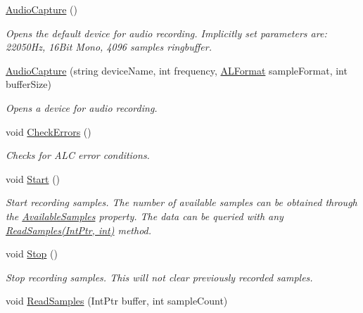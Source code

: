 \begin{DoxyCompactItemize}
\item 
\hyperlink{class_open_t_k_1_1_audio_1_1_audio_capture_a719993b2da0506a1f977847865751023}{Audio\-Capture} ()
\begin{DoxyCompactList}\small\item\em Opens the default device for audio recording. Implicitly set parameters are\-: 22050\-Hz, 16\-Bit Mono, 4096 samples ringbuffer. \end{DoxyCompactList}\item 
\hyperlink{class_open_t_k_1_1_audio_1_1_audio_capture_a042d3f5c08d029221bdf8da8a77a04e8}{Audio\-Capture} (string device\-Name, int frequency, \hyperlink{namespace_open_t_k_1_1_audio_1_1_open_a_l_a4223e02452abfb5070f9b9bf1d426ffc}{A\-L\-Format} sample\-Format, int buffer\-Size)
\begin{DoxyCompactList}\small\item\em Opens a device for audio recording.\end{DoxyCompactList}\item 
void \hyperlink{class_open_t_k_1_1_audio_1_1_audio_capture_a5e6e107b6cb6db8b984659ca02cc23f9}{Check\-Errors} ()
\begin{DoxyCompactList}\small\item\em Checks for A\-L\-C error conditions. \end{DoxyCompactList}\item 
void \hyperlink{class_open_t_k_1_1_audio_1_1_audio_capture_a8865bdca65eaaae4a362ae1bceea5d96}{Start} ()
\begin{DoxyCompactList}\small\item\em Start recording samples. The number of available samples can be obtained through the \hyperlink{class_open_t_k_1_1_audio_1_1_audio_capture_a762b64b2992d6d3f4ba2273bf66fbe41}{Available\-Samples} property. The data can be queried with any \hyperlink{class_open_t_k_1_1_audio_1_1_audio_capture_ab883e5df4b82fce382af12713a59b5ec}{Read\-Samples(\-Int\-Ptr, int)} method. \end{DoxyCompactList}\item 
void \hyperlink{class_open_t_k_1_1_audio_1_1_audio_capture_a231cbcf12c758e7e08988c578f62b44c}{Stop} ()
\begin{DoxyCompactList}\small\item\em Stop recording samples. This will not clear previously recorded samples.\end{DoxyCompactList}\item 
void \hyperlink{class_open_t_k_1_1_audio_1_1_audio_capture_ab883e5df4b82fce382af12713a59b5ec}{Read\-Samples} (Int\-Ptr buffer, int sample\-Count)

\end{DoxyCompactItemize}

